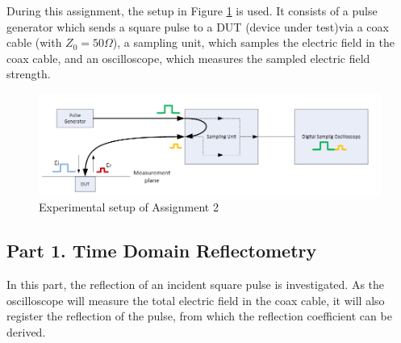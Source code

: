 During this assignment, the setup in Figure \ref{fig:Ass2_setup} is used. It consists of a pulse generator which sends a square pulse to a DUT (device under test)via a coax cable (with $Z_0 = 50 \Omega$), a sampling unit, which samples the electric field in the coax cable, and an oscilloscope, which measures the sampled electric field strength.\\

\begin{figure}[h]
    \centering
    \includegraphics[width=1\textwidth]{Session1_files/Assignment2_setup.PNG}
    \caption{Experimental setup of Assignment 2}
    \label{fig:Ass2_setup}
\end{figure}

\subsection*{Part 1. Time Domain Reflectometry}

In this part, the reflection of an incident square pulse is investigated. As the oscilloscope will measure the total electric field in the coax cable, it will also register the reflection of the pulse, from which the reflection coefficient can be derived.


